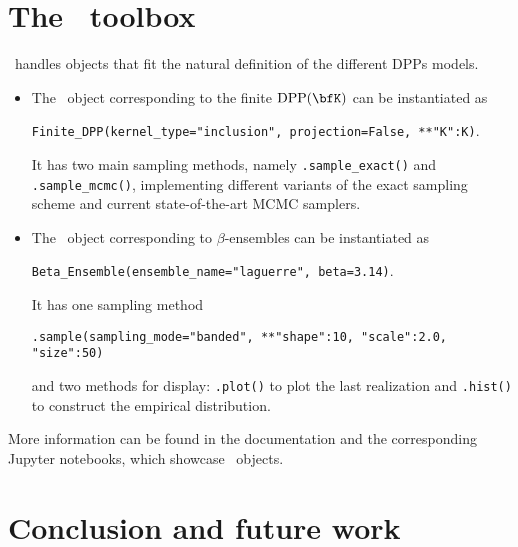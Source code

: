 \documentclass[twoside,11pt]{article}
\begin{document}



\section{The \DPPy\ toolbox} %
\label{sec:the_dppy_toolbox}

  \DPPy\ handles objects that fit the natural definition of the different DPPs models.
  \begin{itemize}
	  \item The \DPPy\ object corresponding to the finite $\DPP(\bfK)$ can be instantiated as
	  \begin{nscenter}
	  	\texttt{Finite_DPP(kernel_type="inclusion", projection=False, **{"K":K})}.
	  \end{nscenter}
		It has two main sampling methods, namely \texttt{.sample_exact()} and \texttt{.sample_mcmc()}, implementing different variants of the exact sampling scheme and current state-of-the-art MCMC samplers.

		\item The \DPPy\ object corresponding to $\beta$-ensembles can be instantiated as
		\begin{nscenter}
			\texttt{Beta_Ensemble(ensemble_name="laguerre", beta=3.14)}.
		\end{nscenter}
		It has one sampling method
		\begin{nscenter}
			\texttt{.sample(sampling_mode="banded", **{"shape":10, "scale":2.0, "size":50})}
		\end{nscenter}
		and two methods for display: \texttt{.plot()} to plot the last realization and \texttt{.hist()} to construct the empirical distribution.
  \end{itemize}

  More information can be found in the documentation and the corresponding Jupyter notebooks, which showcase \DPPy\ objects.


\section{Conclusion and future work} %
\label{sec:conclusion_and_future_work}
\end{document}
